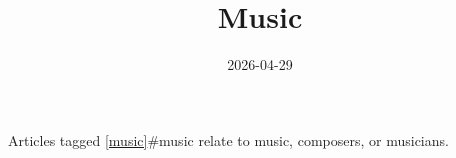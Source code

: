 \documentclass{note}
\title{Music}
\date{2026-04-29}
\begin{document}
Articles tagged \ref{music}{#music} relate to music, composers, or musicians.
\end{document}
